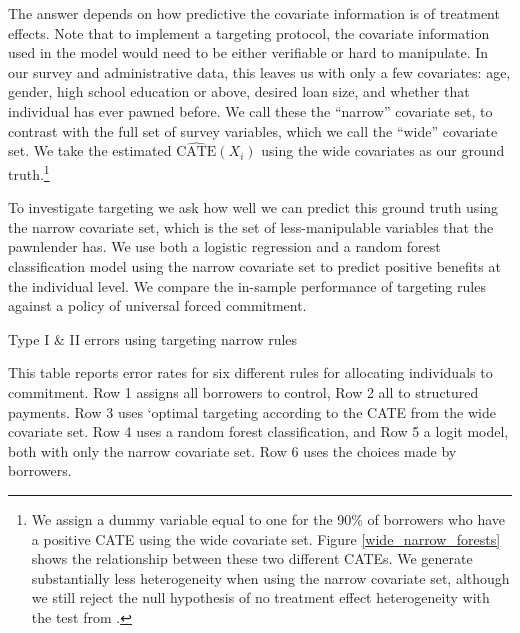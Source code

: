 \documentclass[12pt, a4paper]{article}
\begin{document}
The answer depends on how predictive the covariate information is of treatment effects. Note that to implement a targeting protocol, the covariate information used in the model would need to be either verifiable or hard to manipulate. In our survey and administrative data, this leaves us with only a few covariates: age, gender, high school education or above, desired loan size, and whether that individual has ever pawned before. 
We call these the ``narrow'' covariate set, to contrast with the full set of survey variables, which we call the ``wide'' covariate set.  We take the estimated   $\widehat{\text{CATE}}(X_i)$ using the wide covariates as our ground truth.\footnote{We assign a dummy variable equal to one for the 90\% of borrowers who have a positive CATE using the wide covariate set. Figure \ref{wide_narrow_forests} shows the relationship between these two different  CATEs.  We generate substantially less heterogeneity when using the narrow covariate set, although we still reject the null hypothesis of no treatment effect heterogeneity with the test from \cite{chernozhukov2018generic}.} 

To investigate targeting we ask how well we can predict this ground truth using the narrow covariate set, which is the set of less-manipulable variables that the pawnlender has. We use both a logistic regression and a random forest classification model using the narrow covariate set to predict positive benefits at the individual level.  We compare the in-sample performance of targeting rules against a policy of universal forced commitment.


\begin{table}[H]
\caption{Type I \& II errors using targeting narrow rules}
\label{hit_miss_rule}
\begin{center}
\footnotesize{}
\end{center}
\scriptsize{This table reports error rates for six different rules for allocating individuals to commitment. Row 1 assigns all borrowers to control, Row 2 all to structured payments. Row 3 uses `optimal targeting according to the CATE from the wide covariate set. Row 4 uses a random forest classification, and Row 5 a logit model, both with only the narrow covariate set.  Row 6 uses the choices made by borrowers. %
}
\end{table} 
\end{document}
